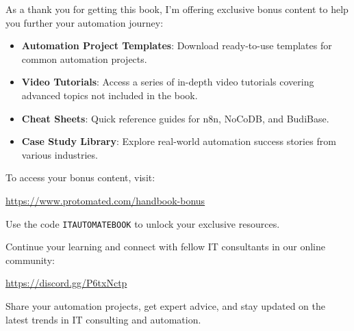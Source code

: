 
As a thank you for getting this book, I'm offering exclusive bonus content to help you further your automation journey:

\begin{itemize}
    \item \textbf{Automation Project Templates}: Download ready-to-use templates for common automation projects.
    \item \textbf{Video Tutorials}: Access a series of in-depth video tutorials covering advanced topics not included in the book.
    \item \textbf{Cheat Sheets}: Quick reference guides for n8n, NoCoDB, and BudiBase.
    \item \textbf{Case Study Library}: Explore real-world automation success stories from various industries.
\end{itemize}

To access your bonus content, visit:

\begin{center}
    \large\url{https://www.protomated.com/handbook-bonus}
\end{center}

Use the code \texttt{ITAUTOMATEBOOK} to unlock your exclusive resources.

\vspace{1cm}

\begin{tcolorbox}[colback=secondarylight,colframe=secondarydark,title=Join Our Community]
    Continue your learning and connect with fellow IT consultants in our online community:

    \begin{center}
        \large\url{https://discord.gg/P6txNctp}
    \end{center}

    Share your automation projects, get expert advice, and stay updated on the latest trends in IT consulting and automation.
\end{tcolorbox}